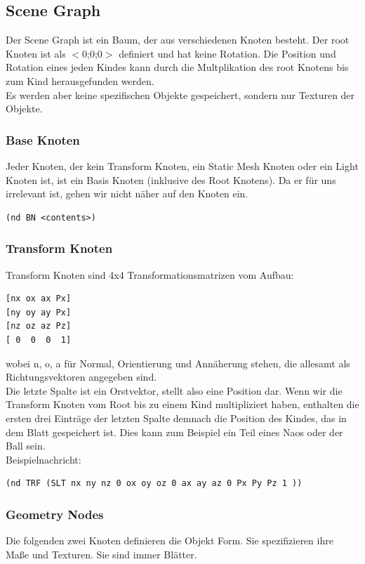 \subsection{Scene Graph}
Der Scene Graph ist ein Baum, der aus verschiedenen Knoten besteht. 
Der root Knoten ist als $<$0;0;0$>$ definiert und hat keine Rotation. 
Die Position und Rotation eines jeden Kindes kann durch die 
Multplikation des root Knotens bis zum Kind herausgefunden werden.\\
Es werden aber keine spezifischen Objekte gespeichert, sondern nur Texturen der Objekte.

\subsubsection{Base Knoten}
Jeder Knoten, der kein Transform Knoten, ein Static Mesh Knoten oder 
ein Light Knoten ist, ist ein Basis Knoten (inklusive des Root Knotens).
 Da er für uns irrelevant ist, gehen wir nicht näher auf den Knoten ein.

\begin{verbatim}(nd BN <contents>)
\end{verbatim}
\subsubsection{Transform Knoten}
Transform Knoten sind 4x4 Transformationsmatrizen vom Aufbau:

\begin{verbatim}
[nx ox ax Px]
[ny oy ay Px]
[nz oz az Pz]
[ 0  0  0  1]
\end{verbatim}
wobei n, o, a für Normal, Orientierung und Annäherung stehen, die allesamt als Richtungsvektoren angegeben sind.\\
Die letzte Spalte ist ein Orstvektor, stellt also eine Position 
dar.
Wenn wir die Transform Knoten vom Root bis zu einem Kind multipliziert 
haben, enthalten die ersten drei Einträge der letzten Spalte demnach die
 Position des Kindes, das in dem Blatt gespeichert ist. Dies kann zum 
Beispiel ein Teil eines Naos oder der Ball sein.\\
Beispielnachricht:

\begin{verbatim}(nd TRF (SLT nx ny nz 0 ox oy oz 0 ax ay az 0 Px Py Pz 1 ))
\end{verbatim}
\subsubsection{Geometry Nodes}
Die folgenden zwei Knoten definieren die Objekt Form. Sie spezifizieren ihre Maße und Texturen. Sie sind immer Blätter.


